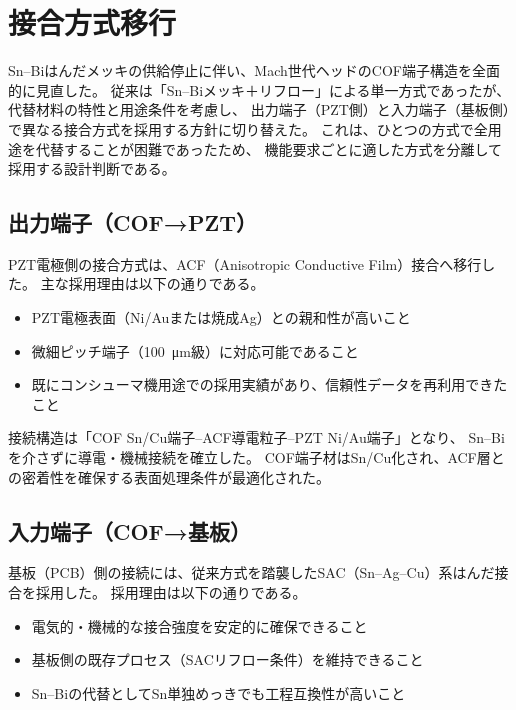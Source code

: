 \documentclass[conference]{IEEEtran}
\begin{document}
\section{接合方式移行}

Sn–Biはんだメッキの供給停止に伴い、Mach世代ヘッドのCOF端子構造を全面的に見直した。  
従来は「Sn–Biメッキ＋リフロー」による単一方式であったが、代替材料の特性と用途条件を考慮し、  
出力端子（PZT側）と入力端子（基板側）で異なる接合方式を採用する方針に切り替えた。  
これは、ひとつの方式で全用途を代替することが困難であったため、  
機能要求ごとに適した方式を分離して採用する設計判断である。

\subsection{出力端子（COF→PZT）}
PZT電極側の接合方式は、ACF（Anisotropic Conductive Film）接合へ移行した。  
主な採用理由は以下の通りである。

\begin{itemize}
  \item PZT電極表面（Ni/Auまたは焼成Ag）との親和性が高いこと  
  \item 微細ピッチ端子（\SI{100}{\micro m}級）に対応可能であること  
  \item 既にコンシューマ機用途での採用実績があり、信頼性データを再利用できたこと
\end{itemize}

接続構造は「COF Sn/Cu端子–ACF導電粒子–PZT Ni/Au端子」となり、  
Sn–Biを介さずに導電・機械接続を確立した。  
COF端子材はSn/Cu化され、ACF層との密着性を確保する表面処理条件が最適化された。

\subsection{入力端子（COF→基板）}
基板（PCB）側の接続には、従来方式を踏襲したSAC（Sn–Ag–Cu）系はんだ接合を採用した。  
採用理由は以下の通りである。

\begin{itemize}
  \item 電気的・機械的な接合強度を安定的に確保できること  
  \item 基板側の既存プロセス（SACリフロー条件）を維持できること  
  \item Sn–Biの代替としてSn単独めっきでも工程互換性が高いこと
\end{itemize}
\end{document}
